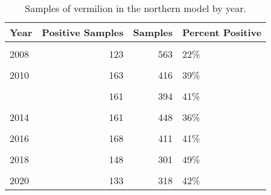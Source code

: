\documentclass[
]{article}
\begin{document}
\begin{table}

\caption{\label{tab:tab-year-ccfrp}Samples of vermilion in the northern model by year.}
\centering
\begin{tabular}[t]{lrrl}
\toprule
Year & Positive Samples & Samples & Percent Positive\\
\midrule
\cellcolor{gray!6}{2007} & \cellcolor{gray!6}{92} & \cellcolor{gray!6}{539} & \cellcolor{gray!6}{17\%}\\
2008 & 123 & 563 & 22\%\\
\cellcolor{gray!6}{2009} & \cellcolor{gray!6}{113} & \cellcolor{gray!6}{366} & \cellcolor{gray!6}{31\%}\\
2010 & 163 & 416 & 39\%\\
\cellcolor{gray!6}{2011} & \cellcolor{gray!6}{139} & \cellcolor{gray!6}{366} & \cellcolor{gray!6}{38\%}\\
\addlinespace
2012 & 161 & 394 & 41\%\\
\cellcolor{gray!6}{2013} & \cellcolor{gray!6}{109} & \cellcolor{gray!6}{426} & \cellcolor{gray!6}{26\%}\\
2014 & 161 & 448 & 36\%\\
\cellcolor{gray!6}{2015} & \cellcolor{gray!6}{98} & \cellcolor{gray!6}{224} & \cellcolor{gray!6}{44\%}\\
2016 & 168 & 411 & 41\%\\
\addlinespace
\cellcolor{gray!6}{2017} & \cellcolor{gray!6}{155} & \cellcolor{gray!6}{366} & \cellcolor{gray!6}{42\%}\\
2018 & 148 & 301 & 49\%\\
\cellcolor{gray!6}{2019} & \cellcolor{gray!6}{164} & \cellcolor{gray!6}{306} & \cellcolor{gray!6}{54\%}\\
2020 & 133 & 318 & 42\%\\
\bottomrule
\end{tabular}
\end{table}

\FloatBarrier
\end{document}

